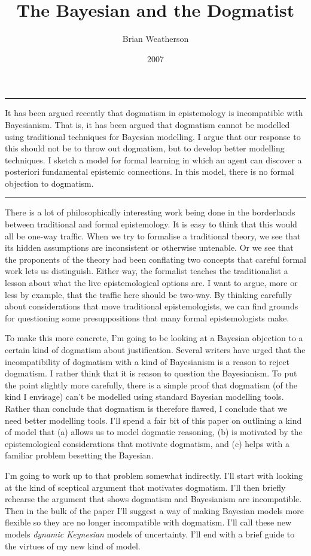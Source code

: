 \documentclass[
  10pt,
  letterpaper,
  DIV=11,
  numbers=noendperiod,
  twoside]{scrartcl}
\title{The Bayesian and the Dogmatist}
\author{Brian Weatherson}
\date{2007}
\renewenvironment{abstract}
 {\vspace{-1.25cm}
 \quotation\small\noindent\rule{\linewidth}{.5pt}\par\smallskip
 \noindent }
 {\par\noindent\rule{\linewidth}{.5pt}\endquotation}
\begin{document}
\maketitle
\begin{abstract}
It has been argued recently that dogmatism in epistemology is
incompatible with Bayesianism. That is, it has been argued that
dogmatism cannot be modelled using traditional techniques for Bayesian
modelling. I argue that our response to this should not be to throw out
dogmatism, but to develop better modelling techniques. I sketch a model
for formal learning in which an agent can discover a posteriori
fundamental epistemic connections. In this model, there is no formal
objection to dogmatism.
\end{abstract}


There is a lot of philosophically interesting work being done in the
borderlands between traditional and formal epistemology. It is easy to
think that this would all be one-way traffic. When we try to formalise a
traditional theory, we see that its hidden assumptions are inconsistent
or otherwise untenable. Or we see that the proponents of the theory had
been conflating two concepts that careful formal work lets us
distinguish. Either way, the formalist teaches the traditionalist a
lesson about what the live epistemological options are. I want to argue,
more or less by example, that the traffic here should be two-way. By
thinking carefully about considerations that move traditional
epistemologists, we can find grounds for questioning some
presuppositions that many formal epistemologists make.

To make this more concrete, I'm going to be looking at a Bayesian
objection to a certain kind of dogmatism about justification. Several
writers have urged that the incompatibility of dogmatism with a kind of
Bayesianism is a reason to reject dogmatism. I rather think that it is
reason to question the Bayesianism. To put the point slightly more
carefully, there is a simple proof that dogmatism (of the kind I
envisage) can't be modelled using standard Bayesian modelling tools.
Rather than conclude that dogmatism is therefore flawed, I conclude that
we need better modelling tools. I'll spend a fair bit of this paper on
outlining a kind of model that (a) allows us to model dogmatic
reasoning, (b) is motivated by the epistemological considerations that
motivate dogmatism, and (c) helps with a familiar problem besetting the
Bayesian.

I'm going to work up to that problem somewhat indirectly. I'll start
with looking at the kind of sceptical argument that motivates dogmatism.
I'll then briefly rehearse the argument that shows dogmatism and
Bayesianism are incompatible. Then in the bulk of the paper I'll suggest
a way of making Bayesian models more flexible so they are no longer
incompatible with dogmatism. I'll call these new models \emph{dynamic
Keynesian} models of uncertainty. I'll end with a brief guide to the
virtues of my new kind of model.
\end{document}
